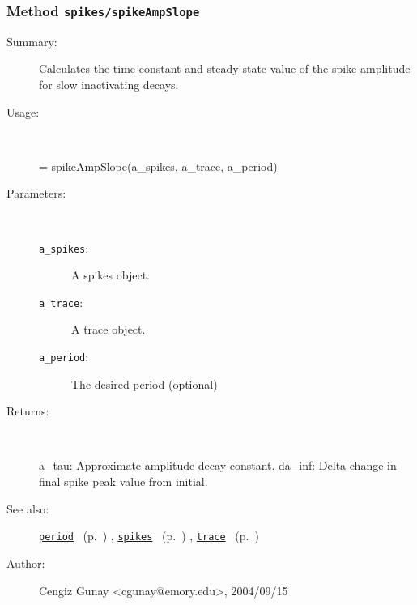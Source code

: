 \subsubsection[Method \texttt{spikeAmpSlope}]{Method \texttt{spikes/spikeAmpSlope}}%
%
\label{ref_spikes__spikeAmpSlope}%
\hypertarget{ref_spikes__spikeAmpSlope}{}%
\begin{description}
\item[Summary:]Calculates the time constant and steady-state value
		      of the spike amplitude for slow inactivating decays.
%
\item[Usage:]~%
\begin{lyxcode}%
[a\_tau, da\_inf] = spikeAmpSlope(a\_spikes, a\_trace, a\_period)
%
\end{lyxcode}%
%
%
\item[Parameters:]~
\begin{description}%
\item[\texttt{a\_spikes}:]
 A spikes object.
\item[\texttt{a\_trace}:]
 A trace object.
\item[\texttt{a\_period}:]
 The desired period (optional)
\end{description}%
%
\item[Returns:]~

	a\_tau: Approximate amplitude decay constant.
	da\_inf: Delta change in final spike peak value from initial.
%
%
\item[See also:]%
\hyperlink{ref_period}{\texttt{period}}%
\ (p.~\pageref{ref_period})%
%
, \hyperlink{ref_spikes}{\texttt{spikes}}%
\ (p.~\pageref{ref_spikes})%
%
, \hyperlink{ref_trace}{\texttt{trace}}%
\ (p.~\pageref{ref_trace})%
%
%
\item[Author:]%
Cengiz Gunay <cgunay@emory.edu>, 2004/09/15%
\end{description}
\methodline%
